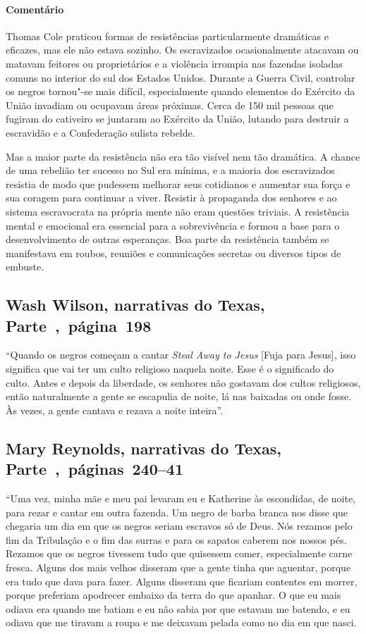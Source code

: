 \paragraph{Comentário}\quad
{\small
Thomas Cole praticou formas de resistências particularmente
dramáticas e eficazes, mas ele não estava sozinho. Os escravizados
ocasionalmente atacavam ou matavam feitores ou proprietários e a
violência irrompia nas fazendas isoladas comuns no interior do sul dos
Estados Unidos. Durante a Guerra Civil, controlar os negros tornou"-se
mais difícil, especialmente quando elementos do Exército da União
invadiam ou ocupavam áreas próximas. Cerca de 150 mil pessoas que
fugiram do cativeiro se juntaram ao Exército da União, lutando para
destruir a escravidão e a Confederação sulista rebelde.

Mas a maior parte da resistência não era tão visível nem tão
dramática. A chance de uma rebelião ter sucesso no Sul era mínima, e a
maioria dos escravizados resistia de modo que pudessem melhorar seus
cotidianos e aumentar sua força e sua coragem para continuar a viver.
Resistir à propaganda dos senhores e ao sistema escravocrata na própria
mente não eram questões triviais. A resistência mental e emocional
era essencial para a sobrevivência e formou a base para o
desenvolvimento de outras esperanças. Boa parte da resistência também se
manifestava em roubos, reuniões e comunicações secretas ou diversos
tipos de embuste.
}

\subsection{Wash Wilson, narrativas do Texas, Parte~,~página~198}
\label{ref302}

``Quando os negros começam a cantar \emph{Steal Away to Jesus} {[}Fuja para
Jesus{]}, isso significa que vai ter um culto religioso naquela noite.
Esse é o significado do culto. Antes e depois da liberdade, os senhores
não gostavam dos cultos religiosos, então naturalmente a gente se
escapulia de noite, lá nas baixadas ou onde fosse. Às vezes, a gente
cantava e rezava a noite inteira''.

\subsection{Mary Reynolds, narrativas do Texas, Parte~,~páginas~240--41}
\label{ref223}

``Uma vez, minha mãe e meu pai levaram eu e Katherine às escondidas, de
noite, para rezar e cantar em outra fazenda. Um negro de barba branca
nos disse que chegaria um dia em que os negros seriam escravos só de
Deus. Nós rezamos pelo fim da Tribulação e o fim das surras e para os
sapatos caberem nos nossos pés. Rezamos que os negros tivessem tudo que
quisessem comer, especialmente carne fresca. Alguns dos mais velhos
disseram que a gente tinha que aguentar, porque era tudo que dava para
fazer. Alguns disseram que ficariam contentes em morrer, porque
preferiam apodrecer embaixo da terra do que apanhar. O que eu mais
odiava era quando me batiam e eu não sabia por que estavam me batendo, e
eu odiava que me tiravam a roupa e me deixavam pelada como no dia em que
nasci.

